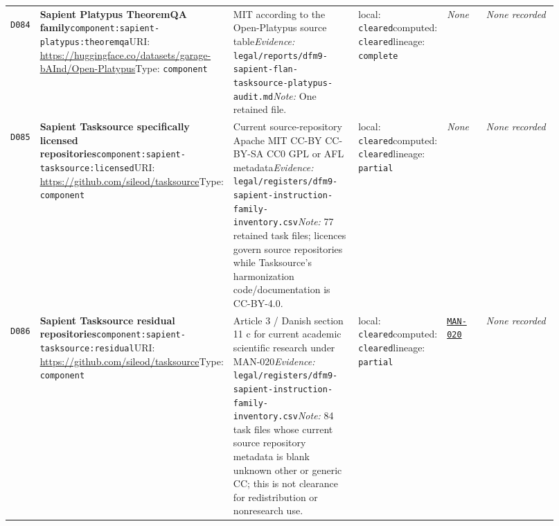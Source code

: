 \documentclass[9pt,a4paper]{article}
\newcommand{\depid}[1]{\hypertarget{dep:#1}{\texttt{#1}}}
\begin{document}
\begin{landscape}
\begin{longtable}{@{}L{0.035\linewidth}L{0.185\linewidth}L{0.27\linewidth}L{0.09\linewidth}L{0.10\linewidth}L{0.24\linewidth}@{}}
\depid{D084} & \textbf{Sapient Platypus TheoremQA family}\newline \nolinkurl{component:sapient-platypus:theoremqa}\newline URI: \url{https://huggingface.co/datasets/garage-bAInd/Open-Platypus}\newline Type: \texttt{component} & MIT according to the Open-Platypus source table\newline \textit{Evidence:} \nolinkurl{legal/reports/dfm9-sapient-flan-tasksource-platypus-audit.md}\newline \textit{Note:} One retained file. & local: \texttt{cleared}\newline computed: \texttt{cleared}\newline lineage: \texttt{complete} & \textit{None} & \textit{None recorded} \\
\depid{D085} & \textbf{Sapient Tasksource specifically licensed repositories}\newline \nolinkurl{component:sapient-tasksource:licensed}\newline URI: \url{https://github.com/sileod/tasksource}\newline Type: \texttt{component} & Current source-repository Apache MIT CC-BY CC-BY-SA CC0 GPL or AFL metadata\newline \textit{Evidence:} \nolinkurl{legal/registers/dfm9-sapient-instruction-family-inventory.csv}\newline \textit{Note:} 77 retained task files; licences govern source repositories while Tasksource's harmonization code/documentation is CC-BY-4.0. & local: \texttt{cleared}\newline computed: \texttt{cleared}\newline lineage: \texttt{partial} & \textit{None} & \textit{None recorded} \\
\depid{D086} & \textbf{Sapient Tasksource residual repositories}\newline \nolinkurl{component:sapient-tasksource:residual}\newline URI: \url{https://github.com/sileod/tasksource}\newline Type: \texttt{component} & Article 3 / Danish section 11 c for current academic scientific research under MAN-020\newline \textit{Evidence:} \nolinkurl{legal/registers/dfm9-sapient-instruction-family-inventory.csv}\newline \textit{Note:} 84 task files whose current source repository metadata is blank unknown other or generic CC; this is not clearance for redistribution or nonresearch use. & local: \texttt{cleared}\newline computed: \texttt{cleared}\newline lineage: \texttt{partial} & \hyperlink{manual:MAN-020}{\texttt{MAN-020}} & \textit{None recorded} \\

\end{longtable}
\end{landscape}
\end{document}
